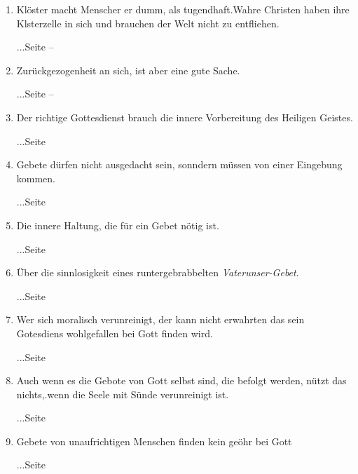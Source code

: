 \begin{enumerate}
 \item Klöster macht Menscher er dumm, als tugendhaft.Wahre Christen haben ihre Klsterzelle in sich und brauchen der Welt nicht zu entfliehen.
 \begin{flushright}...Seite \pageref{ref:05_11_kloster} -- \pageref{ref:05_11_kloster_ende}\end{flushright}
 \item Zurückgezogenheit an sich, ist aber eine gute Sache.
 \begin{flushright}...Seite \pageref{ref:05_13_zurueckgezogenheit} -- \pageref{ref:05_13_zurueckgezogenheit_ende}\end{flushright}
 \item Der richtige Gottesdienst brauch die innere Vorbereitung des Heiligen Geistes.
 \begin{flushright}...Seite \pageref{ref:06_03_gottesdiensvorbereitung}\end{flushright}
 \item Gebete dürfen nicht ausgedacht sein, sonndern müssen von einer Eingebung kommen.
 \begin{flushright}...Seite \pageref{ref:06_04_gebet}\end{flushright}
 \item Die innere Haltung, die für ein Gebet nötig ist.
 \begin{flushright}...Seite \pageref{ref:06_04_gebetshaltung}\end{flushright}
 \item Über die sinnlosigkeit eines runtergebrabbelten \textit{Vaterunser-Gebet}.
 \begin{flushright}...Seite \pageref{ref:06_07_sinnlose_gebete}\end{flushright}
 \item Wer sich moralisch verunreinigt, der kann nicht erwahrten das sein Gotesdiens wohlgefallen bei Gott finden wird.
 \begin{flushright}...Seite \pageref{ref:06_08_moralisch_verunreinigt}\end{flushright}
 \item Auch wenn es die Gebote von Gott selbst sind, die befolgt werden, nützt das nichts,.wenn die Seele mit Sünde verunreinigt ist.
 \begin{flushright}...Seite \pageref{ref:06_09_gottesregeln}\end{flushright}
 \item Gebete von unaufrichtigen Menschen finden kein geöhr bei Gott
 \begin{flushright}...Seite \pageref{ref:06_09_gebetserhoerung}\end{flushright}

\end{enumerate}
